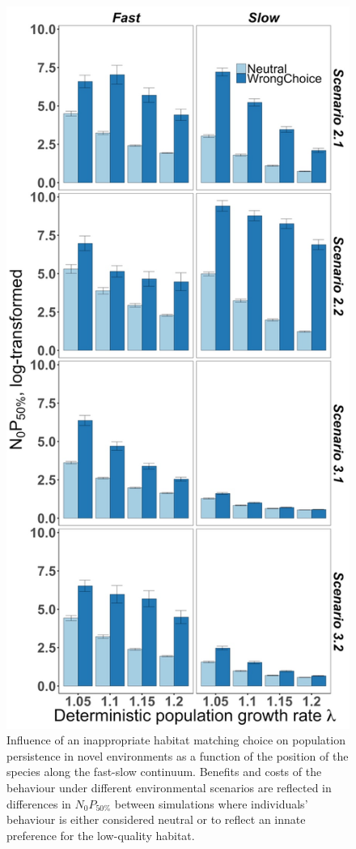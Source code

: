 \begin{figure}
\centering
\includegraphics[height=.75\textheight]{./Figures/Appendix3_2/Fig_7.jpg}
\caption[Effects of \textit{WrongChoice} on $N_{0}P_{50\%}$]{
Influence of an inappropriate habitat matching choice on population persistence
in novel environments as a function of the position of the species along the
fast-slow continuum. Benefits and costs of the behaviour under different
environmental scenarios are reflected in differences in $N_{0}P_{50\%}$ between
simulations where individuals’ behaviour is either considered neutral or to
reflect an innate preference for the low-quality habitat.}
\label{fig:figApp3.2.7}
\end{figure}

